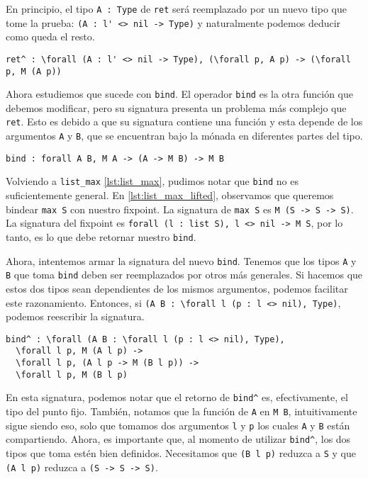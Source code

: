 En principio, el tipo \lstinline{A : Type} de \lstinline{ret} será reemplazado por un nuevo tipo que tome la prueba: \lstinline{(A : l' <> nil -> Type)} y naturalmente podemos deducir como queda el resto. 

\begin{lstlisting}[float=h,frame=tb,caption={Signatura deseada de \lstinline{ret}},label=lst:ret_motiv]
ret^ : \forall (A : l' <> nil -> Type), (\forall p, A p) -> (\forall p, M (A p))
\end{lstlisting}

Ahora estudiemos que sucede con \lstinline{bind}.
El operador \lstinline{bind} es la otra función que debemos modificar, pero su signatura presenta un problema más complejo que \lstinline{ret}. Esto es debido a que su signatura contiene una función y esta depende de los argumentos \lstinline{A} y \lstinline{B}, que se encuentran bajo la mónada en diferentes partes del tipo.

\begin{lstlisting}[frame=tb,caption={Signatura de \lstinline{bind}},label=lst:bind]
bind : forall A B, M A -> (A -> M B) -> M B
\end{lstlisting}

Volviendo a \lstinline{list_max} \ref{lst:list_max}, pudimos notar que \lstinline{bind} no es suficientemente general.
En \ref{lst:list_max_lifted}, observamos que queremos bindear \lstinline{max S} con nuestro fixpoint. La signatura de \lstinline{max S} es \lstinline{M (S -> S -> S)}.
La signatura del fixpoint es \lstinline{forall (l : list S), l <> nil -> M S}, por lo tanto, es lo que debe retornar nuestro \lstinline{bind}.

Ahora, intentemos armar la signatura del nuevo \lstinline{bind}. Tenemos que los tipos \lstinline{A} y \lstinline{B} que toma \lstinline{bind} deben ser reemplazados por otros más generales. Si hacemos que estos dos tipos sean dependientes de los mismos argumentos, podemos facilitar este razonamiento.
Entonces, si \lstinline{(A B : \forall l (p : l <> nil), Type)}, podemos reescribir la signatura.

\begin{lstlisting}[frame=tb,caption={Signatura deseada de \lstinline{bind}}]
bind^ : \forall (A B : \forall l (p : l <> nil), Type),
  \forall l p, M (A l p) ->
  \forall l p, (A l p -> M (B l p)) ->
  \forall l p, M (B l p)
\end{lstlisting}

En esta signatura, podemos notar que el retorno de \lstinline{bind^} es, efectivamente, el tipo del punto fijo. También, notamos que la función de \lstinline{A} en \lstinline{M B}, intuitivamente sigue siendo eso, solo que tomamos dos argumentos \lstinline{l} y \lstinline{p} los cuales \lstinline{A} y \lstinline{B} están compartiendo.
Ahora, es importante que, al momento de utilizar \lstinline{bind^}, los dos tipos que toma estén bien definidos. Necesitamos que \lstinline{(B l p)} reduzca a \lstinline{S} y que \lstinline{(A l p)} reduzca a \lstinline{(S -> S -> S)}.

